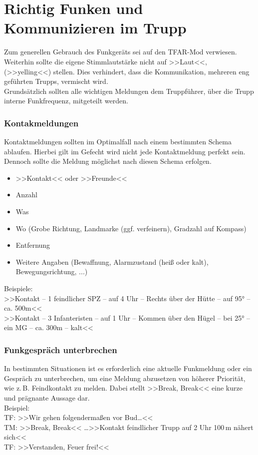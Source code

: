 \section{Richtig Funken und Kommunizieren im Trupp}
	Zum generellen Gebrauch des Funkgeräts sei auf den TFAR-Mod verwiesen. Weiterhin sollte die eigene Stimmlautstärke nicht auf >>Laut<<, (>>yelling<<) stellen. Dies verhindert, dass die Kommunikation, mehreren eng geführten Trupps, vermischt wird.\\
	Grundsätzlich sollten alle wichtigen Meldungen dem Truppführer, über die Trupp interne Funkfrequenz, mitgeteilt werden.
 
\subsubsection{Kontakmeldungen}
	Kontaktmeldungen sollten im Optimalfall nach einem bestimmten Schema ablaufen. Hierbei gilt im Gefecht wird nicht jede Kontaktmeldung perfekt sein. Dennoch sollte die Meldung möglichst nach diesen Schema erfolgen.
	\begin{itemize}
		\setlength{\itemsep}{-4pt}
		\itemsep-4pt
		\item >>Kontakt<< oder >>Freunde<<
		\item Anzahl 
		\item Was
		\item Wo (Grobe Richtung, Landmarke (ggf. verfeinern), Gradzahl auf Kompass) 
		\item Entfernung
		\item Weitere Angaben (Bewaffnung, Alarmzustand (heiß oder kalt), Bewegungsrichtung, ...)
	\end{itemize}

	Beispiele:\\
	>>Kontakt -- 1 feindlicher \acs{SPZ} -- auf 4 Uhr -- Rechts über der Hütte -- auf 95° -- ca. 500m<< \\
	>>Kontakt -- 3 Infanteristen -- auf 1 Uhr -- Kommen über den Hügel -- bei 25° -- ein \acs{MG} -- ca. 300m -- kalt<<

\subsubsection{Funkgespräch unterbrechen}
	In bestimmten Situationen ist es erforderlich eine aktuelle Funkmeldung oder ein Gespräch zu unterbrechen, um eine Meldung abzusetzen von höherer Priorität, wie z.\,B. Feindkontakt zu melden. Dabei stellt >>Break, Break<< eine kurze und prägnante Aussage dar.\\
	Beispiel: \\
	TF: >>Wir gehen folgendermaßen vor Bud\dots<<\\
	TM: >>Break, Break<< \dots >>Kontakt feindlicher Trupp auf 2 Uhr 100\,m nähert sich<<\\
	TF: >>Verstanden, Feuer frei!<<

